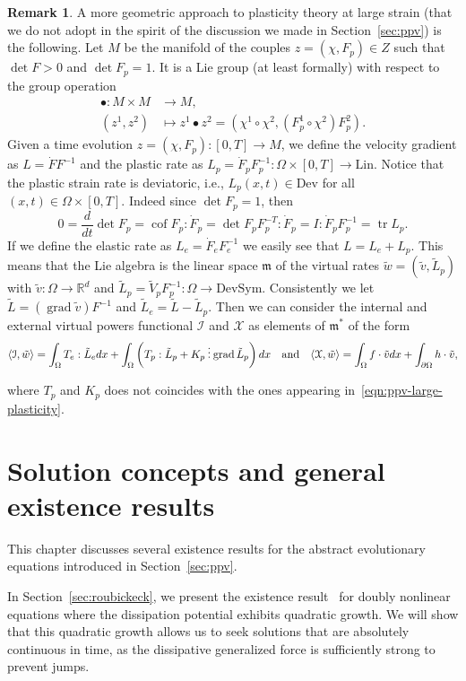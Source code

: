 \documentclass[a4paper,10pt,oneside]{amsbook}
\numberwithin{section}{chapter}
\numberwithin{equation}{chapter}
\theoremstyle{definition}
\newtheorem{rmk}[prop]{Remark}
\DeclareMathOperator{\cof}{cof}
\DeclareMathOperator{\tr}{tr}
\DeclareMathOperator{\grad}{grad}
\DeclarePairedDelimiter{\dual}{\langle}{\rangle}
\newcommand{\threedots}{\mathbin{\vdots}}
\begin{document}
\begin{rmk}
\label{rmk:plasticity-lie-group}
A more geometric approach to plasticity theory at large strain (that we do not adopt in the spirit of the discussion we made in Section~\ref{sec:ppv}) is the following. Let $M$ be the manifold of the couples $z=(\chi,F_p)\in Z$ such that $\det F>0$ and $\det F_p=1$. It is a Lie group (at least formally) with respect to the group operation
\[
\begin{split}
\bullet\colon M\times M&\to M, \\
(z^1,z^2)&\mapsto z^1\bullet z^2=(\chi^1\circ\chi^2,(F_p^1\circ \chi^2)F_p^2).
\end{split}
\]
Given a time evolution $z=(\chi,F_p)\colon[0,T]\to M$, we define the velocity gradient as $L=\dot FF^{-1}$ and the plastic rate as $L_p=\dot F_pF_p^{-1}\colon\Omega\times[0,T]\to\text{Lin}$. Notice that the plastic strain rate is deviatoric, i.e., $L_p(x,t)\in\text{Dev}$ for all $(x,t)\in\Omega\times[0,T]$. Indeed since $\det F_p=1$, then
\[
0=\frac{d}{dt}\det F_p=\cof F_p:\dot F_p=\det F_p F_p^{-T}:\dot F_p=I:\dot F_pF_p^{-1}=\tr L_p.
\]
If we define the elastic rate as $L_e=\dot F_eF_e^{-1}$ we easily see that $L=L_e+L_p$. This means that the Lie algebra is the linear space $\mathfrak{m}$ of the virtual rates $\tilde w=(\tilde v,\tilde L_p)$ with $\tilde v\colon\Omega\to\mathbb{R}^d$ and $\tilde L_p=\tilde V_pF_p^{-1}\colon\Omega\to\text{DevSym}$. Consistently we let $\tilde L=(\grad\tilde v)F^{-1}$ and $\tilde L_e=\tilde L-\tilde L_p$. Then we can consider the internal and external virtual powers functional $\mathcal{I}$ and $\mathcal{X}$ as elements of $\mathfrak{m}^*$ of the form
\[
\dual{\mathcal{I},\tilde w}=\int_\Omega T_e:\tilde L_edx+\int_\Omega\left(T_p:\tilde L_p+K_p\threedots\grad\tilde L_p\right)dx
\quad\text{and}\quad
\dual{\mathcal{X},\tilde w}=\int_\Omega f\cdot\tilde vdx+\int_{\partial\Omega}h\cdot\tilde v,
\]
\end{rmk}
where $T_p$ and $K_p$ does not coincides with the ones appearing in~\eqref{eqn:ppv-large-plasticity}.

\chapter{Solution concepts and general existence results}
\label{chap:solution-concepts}

This chapter discusses several existence results for the abstract evolutionary equations introduced in Section~\ref{sec:ppv}.

In Section~\ref{sec:roubickeck}, we present the existence result~\cite[Proposition 11.1]{roubicek-pde} for doubly nonlinear equations where the dissipation potential exhibits quadratic growth. We will show that this quadratic growth allows us to seek solutions that are absolutely continuous in time, as the dissipative generalized force is sufficiently strong to prevent jumps.
\end{document}
